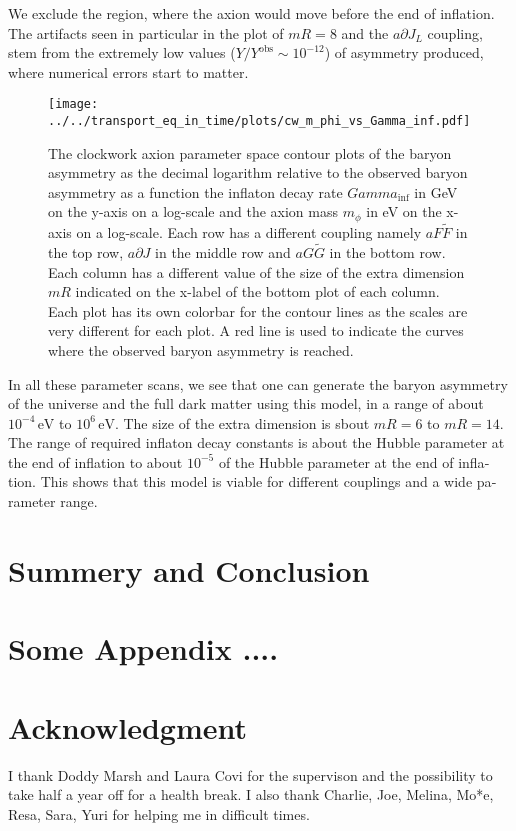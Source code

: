 \documentclass[master,       %
               twoside,        %
               BCOR10mm,       %
               english,ngerman, %
               ]{GAUBM}
\begin{document}
\begin{otherlanguage}{english}
We exclude the region, where the axion would move before the end of inflation.
The artifacts seen in particular in the plot of $mR = 8$ and the $a \partial J_L$ coupling, stem from the extremely low values ($Y / Y^\mathrm{obs} \sim 10^{-12}$) of asymmetry produced, where numerical errors start to matter.
\begin{figure}[H]
    \texttt{[image: ../../transport\_eq\_in\_time/plots/cw\_m\_phi\_vs\_Gamma\_inf.pdf]}
    \caption{The clockwork axion parameter space contour plots of the baryon asymmetry as the decimal logarithm relative to the observed baryon asymmetry as a function the inflaton decay rate $Gamma_\mathrm{inf}$ in GeV on the y-axis on a log-scale and the axion mass $m_\phi$ in eV on the x-axis on a log-scale.
    Each row has a different coupling namely $a F \tilde{F}$ in the top row, $a \partial J$ in the middle row and $a G \tilde{G}$ in the bottom row. Each column has a different value of the size of the extra dimension $mR$ indicated on the x-label of the bottom plot of each column. Each plot has its own colorbar for the contour lines as the scales are very different for each plot. A red line is used to indicate the curves where the observed baryon asymmetry is reached.}
	\label{fig:cw_m_phi_vs_Gamma_inf}
\end{figure}
In all these parameter scans, we see that one can generate the baryon asymmetry of the universe and the full dark matter using this model, in a range of about $10^{-4} \, \mathrm{eV}$ to $10^{6} \, \mathrm{eV}$. The size of the extra dimension is sbout $mR = 6$ to $mR = 14$. The range of required inflaton decay constants is about the Hubble parameter at the end of inflation to about $10^{-5}$ of the Hubble parameter at the end of inflation.
This shows that this model is viable for different couplings and a wide parameter range.


\chapter{Summery and Conclusion}


\appendix

\chapter{Some Appendix ....}

\cleardoublepage


\chapter*{Acknowledgment}
I thank Doddy Marsh and Laura Covi for the supervison and the possibility to take half a year off for a health break.
I also thank Charlie, Joe, Melina, Mo*e, Resa, Sara, Yuri for helping me in difficult times.

\end{otherlanguage}
\Declaration
\end{document}
